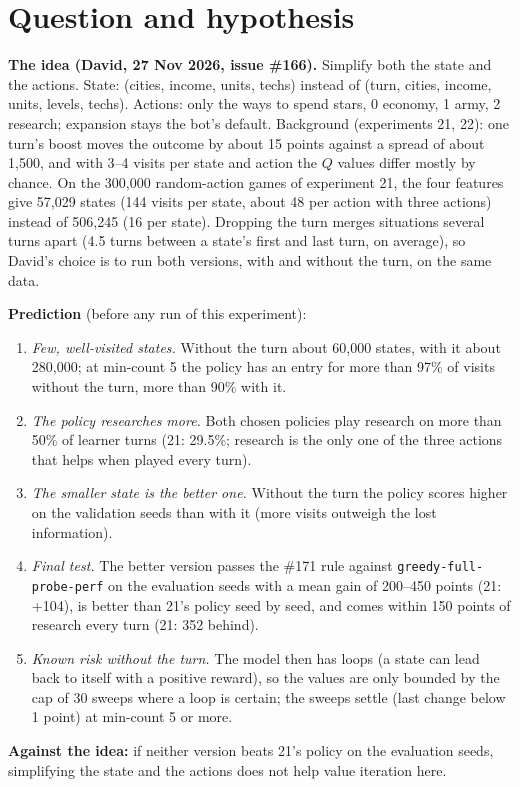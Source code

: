 \documentclass{../polyexp}
\begin{document}

\ExpHeader

\section{Question and hypothesis}
\textbf{The idea (David, 27 Nov 2026, issue \#166).} Simplify both the state and the actions. State: (cities, income,
units, techs) instead of (turn, cities, income, units, levels, techs). Actions: only the ways to spend stars,
0 economy, 1 army, 2 research; expansion stays the bot's default. Background (experiments 21, 22): one turn's boost
moves the outcome by about 15 points against a spread of about 1{,}500, and with 3--4 visits per state and action the
$Q$ values differ mostly by chance. On the 300{,}000 random-action games of experiment 21, the four features give
57{,}029 states (144 visits per state, about 48 per action with three actions) instead of 506{,}245 (16 per state).
Dropping the turn merges situations several turns apart (4.5 turns between a state's first and last turn, on
average), so David's choice is to run both versions, with and without the turn, on the same data.

\textbf{Prediction} (before any run of this experiment):
\begin{enumerate}
  \item \emph{Few, well-visited states.} Without the turn about 60{,}000 states, with it about 280{,}000; at min-count
        5 the policy has an entry for more than 97\% of visits without the turn, more than 90\% with it.
  \item \emph{The policy researches more.} Both chosen policies play research on more than 50\% of learner turns
        (21: 29.5\%; research is the only one of the three actions that helps when played every turn).
  \item \emph{The smaller state is the better one.} Without the turn the policy scores higher on the validation
        seeds than with it (more visits outweigh the lost information).
  \item \emph{Final test.} The better version passes the \#171 rule against \texttt{greedy-full-probe-perf} on the
        evaluation seeds with a mean gain of 200--450 points (21: +104), is better than 21's policy seed by seed, and
        comes within 150 points of research every turn (21: 352 behind).
  \item \emph{Known risk without the turn.} The model then has loops (a state can lead back to itself with a
        positive reward), so the values are only bounded by the cap of 30 sweeps where a loop is certain; the
        sweeps settle (last change below 1 point) at min-count 5 or more.
\end{enumerate}
\textbf{Against the idea:} if neither version beats 21's policy on the evaluation seeds, simplifying the state and
the actions does not help value iteration here.
\end{document}

